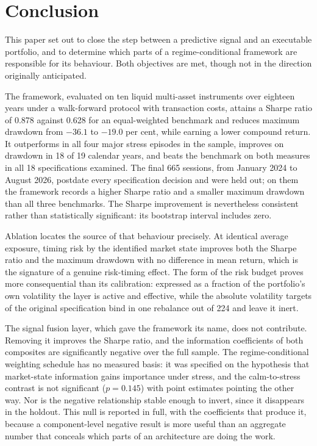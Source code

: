 \section{Conclusion}
\label{sec:conclusion}

This paper set out to close the step between a predictive signal and an executable
portfolio, and to determine which parts of a regime-conditional framework are
responsible for its behaviour. Both objectives are met, though not in the direction
originally anticipated.

The framework, evaluated on ten liquid multi-asset instruments over eighteen years under
a walk-forward protocol with transaction costs, attains a Sharpe ratio of 0.878 against
0.628 for an equal-weighted benchmark and reduces maximum drawdown from $-36.1$ to
$-19.0$ per cent, while earning a lower compound return. It outperforms in all four
major stress episodes in the sample, improves on drawdown in 18 of 19 calendar years,
and beats the benchmark on both measures in all 18 specifications examined. The final
665 sessions, from January 2024 to August 2026, postdate every specification decision
and were held out; on them the framework records a higher Sharpe ratio and a smaller
maximum drawdown than all three benchmarks. The Sharpe improvement is nevertheless
consistent rather than statistically significant: its bootstrap interval includes
zero.

Ablation locates the source of that behaviour precisely. At identical average exposure,
timing risk by the identified market state improves both the Sharpe ratio and the
maximum drawdown with no difference in mean return, which is the signature of a genuine
risk-timing effect. The form of the risk budget proves more consequential than its
calibration: expressed as a fraction of the portfolio's own volatility the layer is
active and effective, while the absolute volatility targets of the original
specification bind in one rebalance out of 224 and leave it inert.

The signal fusion layer, which gave the framework its name, does not contribute.
Removing it improves the Sharpe ratio, and the information coefficients of both
composites are significantly negative over the full sample. The regime-conditional
weighting schedule has no measured basis: it was specified on the hypothesis that
market-state information gains importance under stress, and the calm-to-stress contrast
is not significant ($p = 0.145$) with point estimates pointing the other way. Nor is the
negative relationship stable enough to invert, since it disappears in the holdout. This
null is reported in full,
with the coefficients that produce it, because a component-level negative result is more
useful than an aggregate number that conceals which parts of an architecture are doing
the work.

